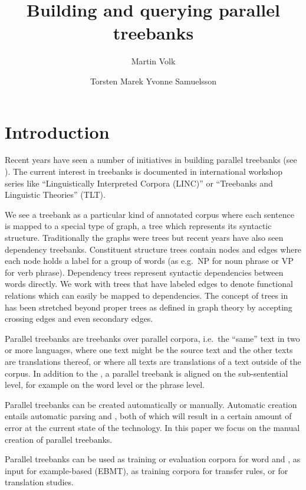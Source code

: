 \documentclass[output=paper]{LSP/langsci}
\author{Martin Volk\affiliation{University of Zurich, Institute of Computational Linguistics}\and
Torsten Marek\lastand 
Yvonne Samuelsson\affiliation{Stockholm University, Department of Linguistics}
}
\title{Building and querying parallel treebanks}
\begin{document}

\section{Introduction}\label{sec:volk:1}

Recent years have seen a number of initiatives in building parallel treebanks (see \citealt{Abeillé2003, NivreEtAl2005}). The current interest in treebanks is documented in international workshop series like ``Linguistically Interpreted Corpora (LINC)'' or ``Treebanks and Linguistic Theories'' (TLT). 

We see a treebank as a particular kind of annotated corpus where each sentence is mapped to a special type of graph, a tree which represents its syntactic structure. Traditionally the graphs were  trees but recent years have also seen dependency treebanks. Constituent structure trees contain nodes and edges where each node holds a label for a group of words (as e.g.~NP for noun phrase or VP for verb phrase). Dependency trees represent syntactic dependencies between words directly. We work with  trees that have labeled edges to denote functional relations which can easily be mapped to dependencies. The concept of  trees in  has been stretched beyond proper trees as defined in graph theory by accepting crossing edges and even secondary edges. 

Parallel treebanks are treebanks over parallel corpora, i.e.~the ``same'' text in two or more languages, where one text might be the source text and the other texts are translations thereof, or where all texts are translations of a text outside of the corpus. In addition to the , a parallel treebank is aligned on the sub-sentential level, for example on the word level or the phrase level. 

Parallel treebanks can be created automatically or manually. Automatic creation entails automatic parsing and , both of which will result in a certain amount of error at the current state of the technology. In this paper we focus on the manual creation of parallel treebanks. 

Parallel treebanks can be used as training or evaluation corpora for word and , as input for example-based  (EBMT), as training corpora for transfer rules, or for translation studies. 
\end{document}
